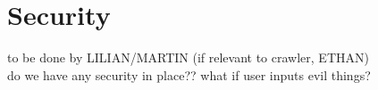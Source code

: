\section{Security}
to be done by LILIAN/MARTIN (if relevant to crawler, ETHAN)\\
do we have any security in place?? what if user inputs evil things?


